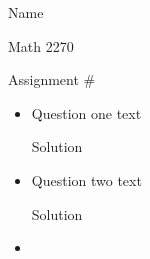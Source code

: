 \documentclass[12pt]{article}
\begin{document}
\hfill Name 

\hfill Math 2270

\hfill Assignment \#


\begin{itemize}
\item[1)] Question one text

Solution

\item[2)] Question two text

Solution

\item[3)] 
\end{itemize}
\end{document}
